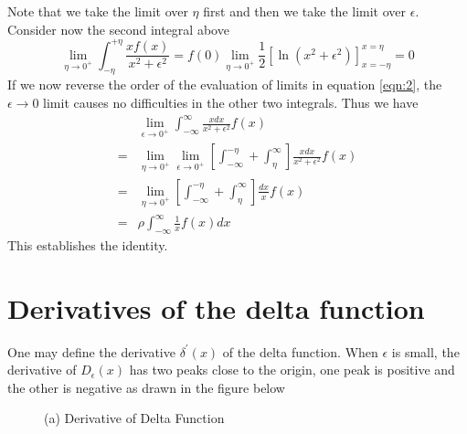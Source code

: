 \begin{enumerate}[label=\textbf{Note : \ \arabic*},start=1]
			Note that we take the limit over $\eta$ first and then we take the limit over $\epsilon$. Consider now the second integral above
			\begin{equation} 
				\lim\limits_{\eta \rightarrow 0^+} \int_{-\eta}^{+\eta} \frac{x f(x)}{x^2 + \epsilon^2} = f(0) \lim\limits_{\eta \rightarrow 0^+} \frac{1}{2}  \left[\ln({x^2 + \epsilon^2}
				)\right]_{x=-\eta}^{x=\eta} = 0
			\end{equation}
			If we now reverse the order of the evaluation of limits in equation \ref{eqn:2}, the $\epsilon \rightarrow 0$ limit causes no difficulties in the other two integrals.
			Thus we have
			\begin{eqnarray}
				&\lim\limits_{\epsilon \rightarrow 0^+} \int_{-\infty}^{\infty} \frac{x dx}{x^2 + \epsilon^2} f(x)\nonumber \\
				 = &\lim\limits_{\eta \rightarrow 0^+} \lim\limits_{\epsilon \rightarrow 0^+} \left[\int_{-\infty}^{-\eta} + \int_{\eta}^{\infty}\right] \frac{x dx}{x^2 + \epsilon^2} f(x) \nonumber \\
				 = &\lim\limits_{\eta \rightarrow 0^+} \left[\int_{-\infty}^{-\eta} + \int_{\eta}^{\infty}\right] \frac{dx}{x} f(x) \nonumber\\
				 = & \rho \int_{-\infty}^{\infty} \frac{1}{x} f(x) dx \nonumber
			\end{eqnarray}
			This establishes the identity.
		\end{enumerate}
		
	\section{Derivatives of the delta function}
		One may define the derivative $\delta^\prime(x)$ of the delta function. When $\epsilon$ is small, the derivative of $D_\epsilon(x)$ has two peaks close to the origin, one peak is positive and the other is negative as drawn in the figure below
		
		\begin{figure}
			\centering
			\caption{(a) Derivative of Delta Function}
			\label{}
		\end{figure}
		
